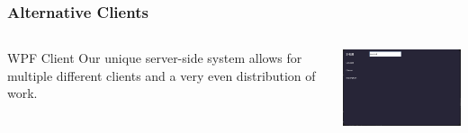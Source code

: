 \documentclass{beamer}
\begin{document}
\begin{frame}
    \frametitle{Alternative Clients}

    \begin{columns}
        \begin{column}{0.38\textwidth}
            \begin{block}{WPF Client}
                Our unique server-side system allows for multiple different clients and a very even distribution of work.
            \end{block}
        \end{column}
        \begin{column}{0.58\textwidth}
            \includegraphics[width=7cm]{WpfBluePrint.png}
        \end{column}
    \end{columns}
\end{frame}
\end{document}
